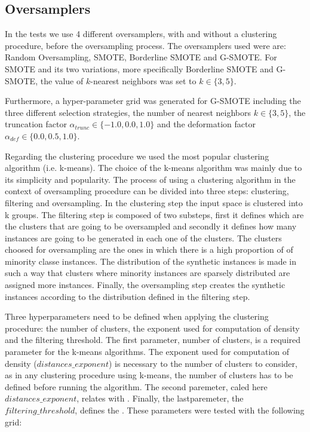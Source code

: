 \documentclass[parskip=full]{scrartcl}
\begin{document}
\subsection{Oversamplers}

In the tests we use 4 different oversamplers, with and without a clustering 
procedure, before the oversampling process. The oversamplers used were are: 
Random Oversampling, SMOTE, Borderline SMOTE and G-SMOTE. For SMOTE and its two 
variations, more specifically Borderline SMOTE and G-SMOTE, the value of 
$k$-nearest neighbors was set to $k \in \{3, 5\}$. 

Furthermore, a hyper-parameter grid was generated for G-SMOTE including the 
three different selection strategies, the number of nearest neighbors $k \in \{3, 5\}$, the truncation factor $\alpha_{trunc} \in \{-1.0, 0.0, 1.0\}$ and the deformation factor $\alpha_{def} \in \{0.0, 0.5, 1.0\}$. 

Regarding the clustering procedure we used the most popular clustering 
algorithm (i.e. k-means). The choice of the k-means algorithm was mainly due to 
its simplicity and popularity. The process of using a clustering algorithm in 
the context of oversampling procedure can be divided into three steps: 
clustering, filtering and oversampling. In the clustering step the input space 
is clustered into k groups. The filtering step is composed of two substeps, 
first it defines which are the clusters that are going to be oversampled and 
secondly it defines how many instances are going to be generated in each one of 
the clusters. The clusters choosed for oversampling are the ones in which there 
is a high proportion of of minority classe instances. The distribution of the 
synthetic instances is made in such a way that clusters where minority 
instances are sparsely distributed are assigned more instances. Finally, the 
oversampling step creates the synthetic instances according to the distribution 
defined in the filtering step.  

Three hyperparameters need to be defined when applying the clustering 
procedure: the number of clusters, the exponent used for computation of density 
and the filtering threshold. The first parameter, number of clusters, is a 
required parameter for the k-means algorithms. The exponent used for 
computation of density ($distances\_exponent$) is necessary to the number of 
clusters to consider, as in any clustering procedure using k-means, the number 
of clusters has to be defined before running the algorithm. The second 
paremeter, caled here $distances\_exponent$, relates with . Finally, the 
lastparemeter, the $filtering\_threshold$, defines the . These parameters were 
tested with the following grid:
\end{document}

